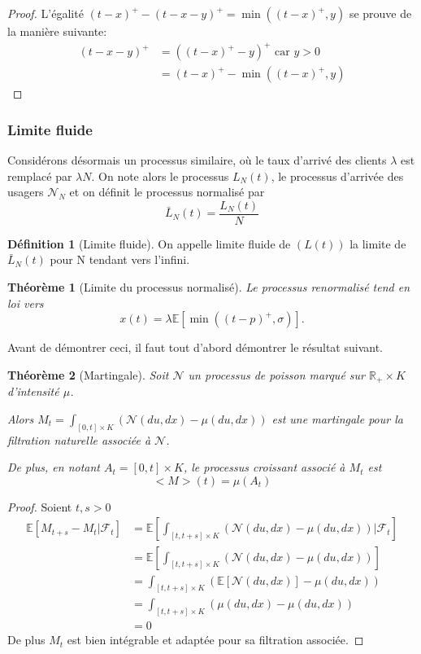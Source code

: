 \documentclass[12pt,a4paper]{article}
\newcommand{\E}[1]{\mathbb{E}\left[ #1 \right]}
\newcommand{\R}{\mathbb{R}}
\newcommand{\1}[1]{\mathbbm{1}_{\{#1\}} }
\newtheorem{theorem}{Théorème}
\theoremstyle{definition}
\newtheorem{definition}{Définition}
\begin{document}
{\begin{proof}
L'égalité $(t-x)^+-(t-x-y)^+ =  \min((t-x)^+,y)$ se prouve de la manière suivante:
\begin{align*}
(t-x-y)^+ &= ((t-x)^+-y)^+ \text{ car } y>0\\
&= (t-x)^+ - \min((t-x)^+,y)
\end{align*}

\end{proof}

\subsubsection{Limite fluide}
Considérons désormais un processus similaire, où le taux d'arrivé des clients $\lambda$ est remplacé par $\lambda N$. On note alors le processus $L_N(t)$, le processus d'arrivée des usagers $\mathcal{N}_N$ et on définit le processus normalisé par 
$$ \bar{L}_N(t) = \frac{L_N(t)}{N}$$


\begin{definition}[Limite fluide]

On appelle limite fluide de $(L(t)) $ la limite de $\bar{L}_N(t)$ pour N tendant vers l'infini.
\end{definition}

\begin{theorem}[Limite du processus normalisé]
\label{Limite_fluide}
Le processus renormalisé tend en loi vers $$x(t) = \lambda\E{\min((t-p)^+,\sigma)}.$$ 

\end{theorem}

Avant de démontrer ceci, il faut tout d'abord démontrer le résultat suivant.
\begin{theorem}[Martingale]
\label{processus_croissant}
Soit $\mathcal{N}$ un processus de poisson marqué sur $\R_+ \times K$ d'intensité $\mu$.

Alors $M_t = \int_{[0,t] \times K} \left(\mathcal{N}(du,dx) - \mu(du,dx)\right)$ est une martingale pour la filtration naturelle associée à $\mathcal{N}$.

De plus, en notant $A_t = [0,t] \times K$, le processus croissant associé à $M_t$ est 
$$<M>(t) = \mu(A_t)$$

\end{theorem}


\begin{proof}{}

Soient $t,s>0$
\begin{align*}
\E{M_{t+s} - M_t|\mathcal{F}_t} &= \E{\int_{[t,t+s] \times K} \left(\mathcal{N}(du,dx) - \mu(du,dx)\right)|\mathcal{F}_t}\\
&= \E{\int_{[t,t+s] \times K} \left(\mathcal{N}(du,dx) - \mu(du,dx)\right)}\\
&=\int_{[t,t+s] \times K} \left(\E{\mathcal{N}(du,dx)} - \mu(du,dx)\right)\\
&=\int_{[t,t+s] \times K} \left(\mu(du,dx) - \mu(du,dx)\right)\\
&= 0
\end{align*}
De plus $M_t$ est bien intégrable et adaptée pour sa filtration associée.


\end{proof}}
\end{document}
